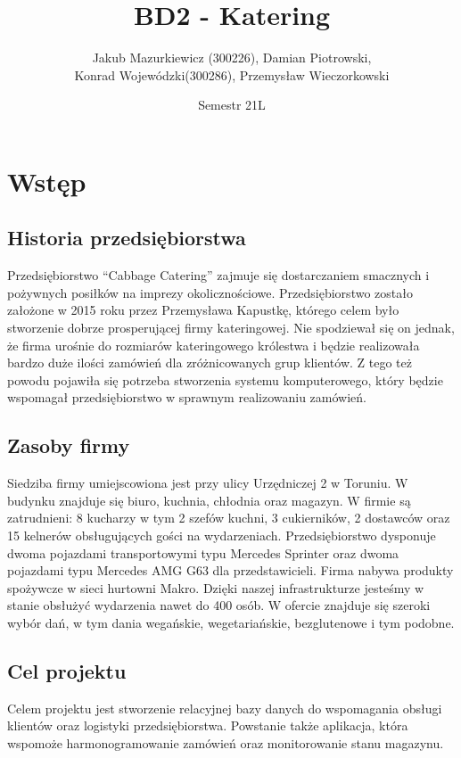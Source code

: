 \documentclass[12pt]{article}
\title{BD2 - Katering}
\author{Jakub Mazurkiewicz (300226), Damian Piotrowski,\\Konrad Wojewódzki(300286), Przemysław Wieczorkowski}
\date{Semestr 21L}
\newcommand{\quotes}[1]{``#1''}
\begin{document}
\maketitle
\tableofcontents

\pagebreak

\section{Wstęp}

\subsection{Historia przedsiębiorstwa}

Przedsiębiorstwo \quotes{Cabbage Catering} zajmuje się dostarczaniem smacznych i pożywnych posiłków na imprezy okolicznościowe. Przedsiębiorstwo zostało założone w 2015 roku przez Przemysława Kapustkę, którego celem było stworzenie dobrze prosperującej firmy kateringowej. Nie spodziewał się on jednak, że firma urośnie do rozmiarów kateringowego królestwa i będzie realizowała bardzo duże ilości zamówień dla zróżnicowanych grup klientów. Z tego też powodu pojawiła się potrzeba stworzenia systemu komputerowego, który będzie wspomagał przedsiębiorstwo w sprawnym realizowaniu zamówień.

\subsection{Zasoby firmy}

Siedziba firmy umiejscowiona jest przy ulicy Urzędniczej 2 w Toruniu. W budynku znajduje się biuro, kuchnia, chłodnia oraz magazyn. W firmie są zatrudnieni: 8 kucharzy w tym 2 szefów kuchni, 3 cukierników, 2 dostawców oraz 15 kelnerów obsługujących gości na wydarzeniach. Przedsiębiorstwo dysponuje dwoma pojazdami transportowymi typu Mercedes Sprinter oraz dwoma pojazdami typu Mercedes AMG G63 dla przedstawicieli. Firma nabywa produkty spożywcze w sieci hurtowni Makro. Dzięki naszej infrastrukturze jesteśmy w stanie obsłużyć wydarzenia nawet do 400 osób. W ofercie znajduje się szeroki wybór dań, w tym dania wegańskie, wegetariańskie, bezglutenowe i tym podobne.

\subsection{Cel projektu}

Celem projektu jest stworzenie relacyjnej bazy danych do wspomagania obsługi klientów oraz logistyki przedsiębiorstwa. Powstanie także aplikacja, która wspomoże harmonogramowanie zamówień oraz monitorowanie stanu magazynu.
\end{document}
